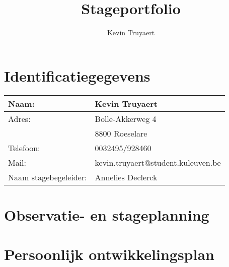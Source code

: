 \documentclass[a4paper,12pt,twoside]{article}%
\title{Stageportfolio}
\author{Kevin Truyaert}
\date{}
\begin{document}
\maketitle


\section*{Identificatiegegevens}
\begin{center}
	\begin{tabular}{ll}
	\hline
	Naam: & Kevin Truyaert\\ \hline
	Adres: & Bolle-Akkerweg 4\\
		& 8800 Roeselare\\\hline
	Telefoon: & 0032495/928460\\\hline
	Mail: & kevin.truyaert@student.kuleuven.be\\\hline
	Naam stagebegeleider: & Annelies Declerck\\ \hline
\end{tabular}
\end{center}

\newpage
\tableofcontents
\newpage

\section{Observatie- en stageplanning}


\section{Persoonlijk ontwikkelingsplan}
\end{document}
